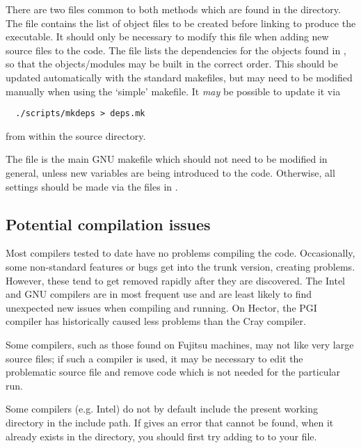There are two files common to both methods which are found in the 
directory. The  file contains the list of object files to be
created before linking to produce the executable. It should only be necessary
to modify this file when adding new source files to the code.
The file 
lists the dependencies for the objects found in , so that
the objects/modules may be built in the correct order. This should be updated
automatically with the standard makefiles, but may need to be modified manually
when using the `simple' makefile. It {\it may} be possible to update it via

\begin{verbatim}
  ./scripts/mkdeps > deps.mk
\end{verbatim}

from within the source directory.

The file  is the main GNU makefile which should not
need to be modified in general, unless new variables are being introduced
to the code. Otherwise, all settings should be made via the files in
.

\subsection{Potential compilation issues}

Most compilers tested to date have no problems compiling the code.
Occasionally, some non-standard features or bugs get into the trunk version, creating
problems. However, these tend to get removed rapidly after they are discovered.
The Intel and GNU compilers are in most frequent use and are least likely to find unexpected new
issues when compiling and running.   On Hector, the PGI compiler has historically caused less problems than the Cray compiler.

Some compilers, such as those found on Fujitsu machines, may not like very
large source files; if such a compiler is used, it may be necessary to edit
the problematic source file and remove code which is not needed for the
particular run. %

Some compilers (e.g. Intel) do not by default include the present working directory
in the include path.  If  gives an error that  cannot be found,
when it already exists in the  directory, you should first try adding  to 
 to your  file.


